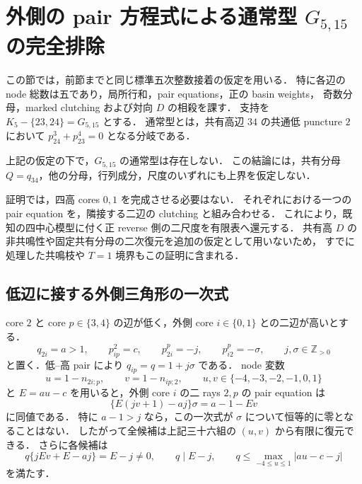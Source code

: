 \section{外側の pair 方程式による通常型 \texorpdfstring{$G_{5,15}$}{G5,15} の完全排除}
\label{g51523:ordinary-section}

この節では，前節までと同じ標準五次整数接着の仮定を用いる．
特に各辺の node 総数は五であり，局所行和，pair equations，正の basin weights，
奇数分母，marked clutching および対向 $D$ の相殺を課す．
支持を $K_5-\{23,24\}=G_{5,15}$ とする．
通常型とは，共有高辺 $34$ の共通低 puncture $2$ において
$p^3_{24}+p^4_{23}=0$ となる分岐である．

\begin{theorem}[通常型の無上界排除]
\label{g51523:no-ordinary}
上記の仮定の下で，$G_{5,15}$ の通常型は存在しない．
この結論には，共有分母 $Q=q_{34}$，他の分母，行列成分，尺度のいずれにも上界を仮定しない．
\end{theorem}

証明では，四高 cores $0,1$ を完成させる必要はない．
それぞれにおける一つの pair equation を，隣接する二辺の clutching と組み合わせる．
これにより，既知の四中心模型に付く正 reverse 側の二尺度を有限表へ還元する．
共有高 $D$ の非共鳴性や固定共有分母の二次復元を追加の仮定として用いないため，
すでに処理した共鳴枝や $T=1$ 境界もこの証明に含まれる．

\subsection{低辺に接する外側三角形の一次式}

\begin{lemma}
\label{g51523:outer-pair}
core $2$ と core $p\in\{3,4\}$ の辺が低く，外側 core $i\in\{0,1\}$ との二辺が高いとする．
\[
 q_{2i}=a>1,\qquad p^2_{ip}=c,\qquad
 p^p_{2i}=-j,\qquad p^p_{i2}=-\sigma,
 \qquad j,\sigma\in\mathbb Z_{>0}
\]
と置く．低--高 pair により $q_{ip}=q=1+j\sigma$ である．
node 変数
\[
 u=1-n_{2i;p},\qquad v=1-n_{ip;2},\qquad
 u,v\in\{-4,-3,-2,-1,0,1\}
\]
と $E=au-c$ を用いると，外側 core $i$ の二 rays $2,p$ の pair equation は
\begin{equation}\label{g51523:outer-linear}
 \bigl\{E(jv+1)-aj\bigr\}\sigma=a-1-Ev
\end{equation}
に同値である．
特に $a-1>j$ なら，この一次式が $\sigma$ について恒等的に零となることはない．
したがって全候補は上記三十六組の $(u,v)$ から有限に復元できる．
さらに各候補は
\begin{equation}\label{g51523:outer-divisor}
 q\bigl\{jEv+E-aj\bigr\}=E-j\ne0,
 \qquad q\mid E-j,
 \qquad q\le\max_{-4\le u\le1}|au-c-j|
\end{equation}
を満たす．
\end{lemma}

